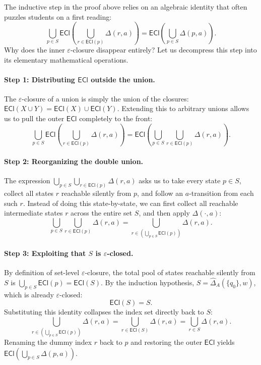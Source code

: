 \begin{formaldetails}
The inductive step in the proof above relies on an algebraic identity that often puzzles students on a first reading:
\[
  \bigcup_{p\in S} \mathsf{ECl}\!\left( \bigcup_{r\in\mathsf{ECl}(p)} \Delta(r,a) \right)
  = \mathsf{ECl}\!\left( \bigcup_{p\in S}\Delta(p,a) \right).
\]
Why does the inner $\varepsilon$-closure disappear entirely? Let us decompress this step into its elementary mathematical operations.

\paragraph{Step 1: Distributing $\mathsf{ECl}$ outside the union.}
The $\varepsilon$-closure of a union is simply the union of the closures: $\mathsf{ECl}(X \cup Y) = \mathsf{ECl}(X) \cup \mathsf{ECl}(Y)$. Extending this to arbitrary unions allows us to pull the outer $\mathsf{ECl}$ completely to the front:
\[
  \bigcup_{p\in S} \mathsf{ECl}\!\left( \bigcup_{r\in\mathsf{ECl}(p)} \Delta(r,a) \right)
  = \mathsf{ECl}\!\left( \bigcup_{p\in S} \bigcup_{r\in\mathsf{ECl}(p)} \Delta(r,a) \right).
\]

\paragraph{Step 2: Reorganizing the double union.}
The expression $\bigcup_{p\in S} \bigcup_{r\in\mathsf{ECl}(p)} \Delta(r,a)$ asks us to take every state $p \in S$, collect all states $r$ reachable silently from $p$, and follow an $a$-transition from each such $r$. Instead of doing this state-by-state, we can first collect all reachable intermediate states $r$ across the entire set $S$, and then apply $\Delta(\cdot, a)$:
\[
  \bigcup_{p\in S} \bigcup_{r\in\mathsf{ECl}(p)} \Delta(r,a)
  = \bigcup_{r \in \left(\bigcup_{p\in S}\mathsf{ECl}(p)\right)} \Delta(r,a).
\]

\paragraph{Step 3: Exploiting that $S$ is $\varepsilon$-closed.}
By definition of set-level $\varepsilon$-closure, the total pool of states reachable silently from $S$ is $\bigcup_{p\in S}\mathsf{ECl}(p) = \mathsf{ECl}(S)$. By the induction hypothesis, $S = \widehat{\Delta}_A(\{q_0\}, w)$, which is already $\varepsilon$-closed:
\[
  \mathsf{ECl}(S) = S.
\]
Substituting this identity collapses the index set directly back to $S$:
\[
  \bigcup_{r \in \left(\bigcup_{p\in S}\mathsf{ECl}(p)\right)} \Delta(r,a)
  = \bigcup_{r \in \mathsf{ECl}(S)} \Delta(r,a)
  = \bigcup_{r\in S} \Delta(r,a).
\]
Renaming the dummy index $r$ back to $p$ and restoring the outer $\mathsf{ECl}$ yields $\mathsf{ECl}(\bigcup_{p\in S}\Delta(p,a))$.


\end{formaldetails}
